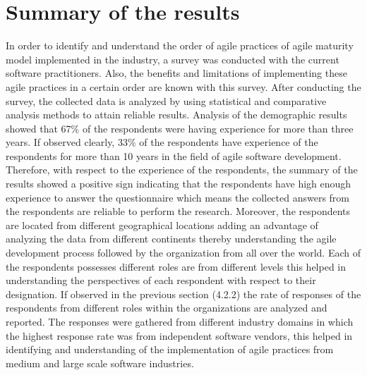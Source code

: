 \documentclass[a4paper,oneside]{bth}
\begin{document}
\section{Summary of the results}
In order to identify and understand the order of agile practices of agile maturity model implemented in the industry, a survey was conducted with the current software practitioners. Also, the benefits and limitations of implementing these agile practices in a certain order are known with this survey. After conducting the survey, the collected data is analyzed by using statistical and comparative analysis methods to attain reliable results. Analysis of the demographic results showed that 67\% of the respondents were having experience for more than three years. If observed clearly, 33\% of the respondents have experience of the respondents for more than 10 years in the field of agile software development. Therefore, with respect to the experience of the respondents, the summary of the results showed a positive sign indicating that the respondents have high enough experience to answer the questionnaire which means the collected answers from the respondents are reliable to perform the research. Moreover, the respondents are located from different geographical locations adding an advantage of analyzing the data from different continents thereby understanding the agile development process followed by the organization from all over the world. Each of the respondents possesses different roles are from different levels this helped in understanding the perspectives of each respondent with respect to their designation. If observed in the previous section (4.2.2) the rate of responses of the respondents from different roles within the organizations are analyzed and reported. The responses were gathered from different industry domains in which the highest response rate was from independent software vendors, this helped in identifying and understanding of the implementation of agile practices from medium and large scale software industries.
\end{document}
